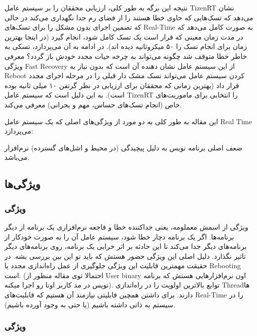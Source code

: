 \documentclass[10pt, a4paper]{article}
\begin{document}
نتیجه این برگه به طور کلی، ارزیابی محققان را بر سیستم عامل TizenRT نشان می‌دهد
که تسک‌هایی که حاوی خطا هستند را از فضای رم جدا نگهداری می‌کند در حالی که تضمین
اجرای بدون مشکل را برای تسک‌های Real-Time به صورت کامل می‌دهد که در مدت زمان
معینی که قرار است یک تسک کامل شود، انجام گیرد (در اینجا بهترین زمان برای انجام
تسک را ۵۰ میکروثانیه دیده اند). در ادامه به آن می‌پردازد، تسکی به خاطر خطا متوقف
شد چگونه می‌تواند به چرخه حیات مجدد خودش باز گردد؟ معرفی ویژگی Fast Recovery از
این سیستم عامل نشان دهنده آن است که بدون نیاز به Reboot کردن سیستم عامل می‌تواند
تسک مشک دار قبلی را در مرحله اجرای مجدد قرار داد (بهترین زمانی که محققان برای
ارزیابی در نظر گرتفن ۱۰ میلی ثانیه بوده است). به این دلیل است که سیستم عامل
TizenRT را انتخابی برای ماموریت‌های خاص (انجام تسک‌های حساس، مهم و بحرانی) معرفی
می‌کند.

این مقاله به طور کلی به دو مورد از ویژگی‌های اصلی که یک سیستم عامل Real Time
می‌پردازد:

ضعف اصلی برنامه نویس به دلیل پیچیدگی (در محیط و اشل‌های گسترده) نرم‌افزار می‌باشد.

\subsection{ویژگی‌ها}

\subsubsection{ویژگی }

ویژگی  از اسمش معملومه، یعنی جداکننده خطا و فاجعه نرم‌افزاری
یک برنامه از دیگر برنامه‌ها. اگر یک برنامه دچار خطا شود، سیستم‌ عامل آن را به
صورت خودکار از برنامه‌های دیگر جدا می‌کند تا این حادثه بر اثر خرابی یک برنامه،
روی برنامه‌های دیگر تاثیر نگذارد. دلیل اصلی این ویژگی حضور  هستش که باید تو این بین بررسی بشه. در حقیقت مهمترین قابلیت این ویژگی
جلوگیری از عمل راه‌اندازی مجدد یا Rebooting است. (احتمالا توی مقاله منظور از
User binary اون نرم‌افزارهایی هستش که برنامه نویس در مد کاربر اونا رو اجرا
میکنه). توابع  بالاترین اولویت را  در راه‌اندازی Thread‌ها
دارند.  برای داشتن همچین قابلیتی نیازمند آن هستیم که قابلیت‌های Real-Time را در
سیستم به ذاتی داشته باشیم (یا حتی به وجود آورده باشیم).

\subsubsection{ویژگی }
\end{document}
